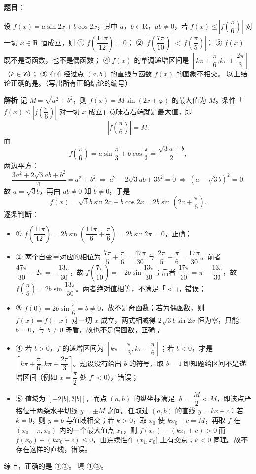 \begin{answer}

\textbf{题目}：

设 $f(x)=a\sin2x+b\cos2x$，其中 $a$，$b\in\mathbf R$，$ab\neq0$，若 $f(x)\leqslant\left|f\left(\dfrac{\pi}{6}\right)\right|$ 对一切 $x\in\mathbf R$ 恒成立，则
① $f\left(\dfrac{11\pi}{12}\right)=0$；
② $\left|f\left(\dfrac{7\pi}{10}\right)\right|<\left|f\left(\dfrac{\pi}{5}\right)\right|$；
③ $f(x)$ 既不是奇函数，也不是偶函数；
④ $f(x)$ 的单调递增区间是 $\left[k\pi+\dfrac{\pi}{6},k\pi+\dfrac{2\pi}{3}\right]$（$k\in\mathbf Z$）；
⑤ 存在经过点 $(a,b)$ 的直线与函数 $f(x)$ 的图象不相交。
以上结论正确的是\gkblank{}。（写出所有正确结论的编号）

\textbf{解析}
记 $M=\sqrt{a^2+b^2}$，则 $f(x)=M\sin(2x+\varphi)$ 的最大值为 $M$。条件「$f(x)\leqslant\left|f\left(\dfrac{\pi}{6}\right)\right|$ 对一切 $x$ 成立」意味着右端就是最大值，即
\nopagebreak[4]
\[
\left|f\left(\frac{\pi}{6}\right)\right|=M.
\]
而
\nopagebreak[4]
\[
f\left(\frac{\pi}{6}\right)=a\sin\frac{\pi}{3}+b\cos\frac{\pi}{3}=\frac{\sqrt3a+b}{2},
\]
两边平方：
\nopagebreak[4]
\[
\frac{3a^2+2\sqrt3ab+b^2}{4}=a^2+b^2\ \Longrightarrow\ a^2-2\sqrt3ab+3b^2=0\ \Longrightarrow\ (a-\sqrt3b)^2=0.
\]
故 $a=\sqrt3b$，再由 $ab\neq0$ 知 $b\neq0$。于是
\nopagebreak[4]
\[
f(x)=\sqrt3b\sin2x+b\cos2x=2b\sin\left(2x+\frac{\pi}{6}\right).
\]
逐条判断：
\begin{itemize}
\item ① $f\left(\dfrac{11\pi}{12}\right)=2b\sin\left(\dfrac{11\pi}{6}+\dfrac{\pi}{6}\right)=2b\sin2\pi=0$，正确；
\item ② 两个自变量对应的相位为 $\dfrac{7\pi}{5}+\dfrac{\pi}{6}=\dfrac{47\pi}{30}$ 与 $\dfrac{2\pi}{5}+\dfrac{\pi}{6}=\dfrac{17\pi}{30}$。前者 $\dfrac{47\pi}{30}-2\pi=-\dfrac{13\pi}{30}$，故 $f\left(\dfrac{7\pi}{10}\right)=-2b\sin\dfrac{13\pi}{30}$；后者 $\dfrac{17\pi}{30}=\pi-\dfrac{13\pi}{30}$，故 $f\left(\dfrac{\pi}{5}\right)=2b\sin\dfrac{13\pi}{30}$。两者绝对值相等，不满足「$<$」，错误；
\item ③ $f(0)=2b\sin\dfrac{\pi}{6}=b\neq0$，故不是奇函数；若为偶函数，则 $f(x)=f(-x)$ 对一切 $x$ 成立，两式相减得 $2\sqrt3b\sin2x$ 恒为零，只能 $b=0$，与 $b\neq0$ 矛盾，故也不是偶函数，正确；
\item ④ 若 $b>0$，$f$ 的递增区间为 $\left[k\pi-\dfrac{\pi}{3},k\pi+\dfrac{\pi}{6}\right]$；若 $b<0$，才是 $\left[k\pi+\dfrac{\pi}{6},k\pi+\dfrac{2\pi}{3}\right]$。题设没有给出 $b$ 的符号，取 $b=1$ 即知题给区间不是递增区间（例如 $x=\dfrac{\pi}{2}$ 处 $f'<0$），错误；
\item ⑤ 值域为 $[-2|b|,2|b|]$，而点 $(a,b)$ 的纵坐标满足 $|b|=\dfrac{M}{2}<M$，即该点严格位于两条水平切线 $y=\pm M$ 之间。任取过 $(a,b)$ 的直线 $y=kx+c$：若 $k=0$，则 $y=b$ 与值域相交；若 $k>0$，取 $x_0$ 使 $kx_0+c=M$，再取 $f$ 在 $\left(x_0-\pi,x_0\right)$ 内的一个最大值点 $x_1$，则 $f(x_1)-(kx_1+c)>0$ 而 $f(x_0)-(kx_0+c)\leqslant0$，由连续性在 $(x_1,x_0]$ 上有交点；$k<0$ 同理。故不存在这样的直线，错误。
\end{itemize}
综上，正确的是 ①③。
填 ①③。


\end{answer}
